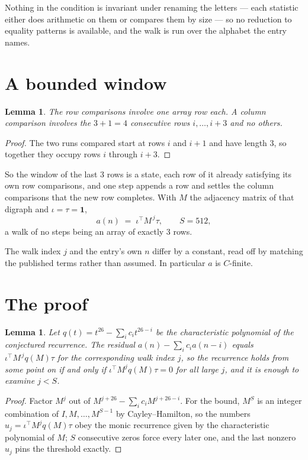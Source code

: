 \documentclass[11pt,a4paper]{article}
\theoremstyle{plain}
\newtheorem{lemma}[theorem]{Lemma}
\theoremstyle{definition}
\begin{document}
Nothing in the condition is invariant under renaming the letters --- each statistic either does
arithmetic on them or compares them by size --- so no reduction to equality patterns is
available, and the walk is run over the alphabet the entry names.

\section{A bounded window}

\begin{lemma}\label{lem:win}
The row comparisons involve one array row each. A column comparison involves the
$3+1=4$ consecutive rows $i,\dots,i{+}3$ and no others.
\end{lemma}

\begin{proof}
The two runs compared start at rows $i$ and $i+1$ and have length $3$, so together they
occupy rows $i$ through $i+3$.
\end{proof}

So the window of the last $3$ rows is a state, each row of it already satisfying its own row
comparisons, and one step appends a row and settles the column comparisons that the new row
completes. With $M$ the adjacency matrix of that digraph and $\iota=\tau=\mathbf{1}$,
\[
a(n)\;=\;\iota^{\!\top}M^{\,j}\tau ,\qquad S=512,
\]
a walk of no steps being an array of exactly $3$ rows.

The walk index $j$ and the entry's own $n$ differ by a constant, read off by matching the
published terms rather than assumed. In particular $a$ is $C$-finite.

\section{The proof}

\begin{lemma}\label{lem:crit}
Let $q(t)=t^{26}-\sum_i c_it^{26-i}$ be the characteristic polynomial of the
conjectured recurrence. The residual $a(n)-\sum_ic_ia(n-i)$ equals
$\iota^{\!\top}M^{\,j}q(M)\tau$ for the corresponding walk index $j$, so the recurrence
holds from some point on if and only if $\iota^{\!\top}M^{j}q(M)\tau=0$ for all large $j$,
and it is enough to examine $j<S$.
\end{lemma}

\begin{proof}
Factor $M^{j}$ out of $M^{j+26}-\sum_ic_iM^{j+26-i}$. For the bound, $M^{S}$
is an integer combination of $I,M,\dots,M^{S-1}$ by Cayley--Hamilton, so the numbers
$u_j=\iota^{\!\top}M^{j}q(M)\tau$ obey the monic recurrence given by the characteristic
polynomial of $M$; $S$ consecutive zeros force every later one, and the last nonzero $u_j$
pins the threshold exactly.
\end{proof}
\end{document}

